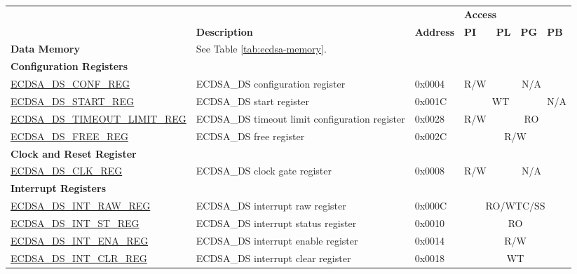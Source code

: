 \begin{small}
\begin{longtable}{ | p{4.8cm} | l | p{1.2cm} | l | l | l | l | }
\hline
\rowcolor{lightgray}
 &  &   & \multicolumn{4}{|l|}{\textbf{Access}} \\\cline{4-7}
\rowcolor{lightgray}
\multirow{-2}{*}{\textbf{Name}} & \multirow{-2}{*}{\textbf{Description}}  &  \multirow{-2}{*}{\textbf{Address}} & \textbf{PI} & \textbf{PL} & \textbf{PG} & \textbf{PB} \\ \hline
\endhead
\textbf{Data Memory} & \multicolumn{6}{|l|}{See Table \ref{tab:ecdsa-memory}.} \\ \hline
\multicolumn{7}{|l|}{\textbf{Configuration Registers}} \\\hline
\hyperref[regdesc:ECDSADSCONFREG]{ECDSA\_DS\_CONF\_REG} & ECDSA\_DS configuration register & 0x0004 & R/W & \multicolumn{3}{|c|}{N/A} \\ \hline
\hyperref[regdesc:ECDSADSSTARTREG]{ECDSA\_DS\_START\_REG} & ECDSA\_DS start register & 0x001C & \multicolumn{3}{|c|}{WT} & N/A \\ \hline
\hyperref[regdesc:ECDSADSTIMEOUTLIMITREG]{ECDSA\_DS\_TIMEOUT\_LIMIT\_REG} & ECDSA\_DS timeout limit configuration register & 0x0028 & R/W & \multicolumn{3}{|c|}{RO}  \\ \hline
\hyperref[regdesc:ECDSADSFREEREG]{ECDSA\_DS\_FREE\_REG} & ECDSA\_DS free register & 0x002C & \multicolumn{4}{|c|}{R/W} \\ \hline
\multicolumn{7}{|l|}{\textbf{Clock and Reset Register}} \\ \hline
\hyperref[regdesc:ECDSADSCLKREG]{ECDSA\_DS\_CLK\_REG} & ECDSA\_DS clock gate register & 0x0008 & R/W & \multicolumn{3}{|c|}{N/A} \\ \hline
\multicolumn{7}{|l|}{\textbf{Interrupt Registers}} \\ \hline
\hyperref[regdesc:ECDSADSINTRAWREG]{ECDSA\_DS\_INT\_RAW\_REG} & ECDSA\_DS interrupt raw register & 0x000C & \multicolumn{4}{|c|}{RO/WTC/SS} \\ \hline
\hyperref[regdesc:ECDSADSINTSTREG]{ECDSA\_DS\_INT\_ST\_REG} & ECDSA\_DS interrupt status register & 0x0010 & \multicolumn{4}{|c|}{RO} \\ \hline
\hyperref[regdesc:ECDSADSINTENAREG]{ECDSA\_DS\_INT\_ENA\_REG} & ECDSA\_DS interrupt enable register & 0x0014 & \multicolumn{4}{|c|}{R/W} \\ \hline
\hyperref[regdesc:ECDSADSINTCLRREG]{ECDSA\_DS\_INT\_CLR\_REG} & ECDSA\_DS interrupt clear register & 0x0018 & \multicolumn{4}{|c|}{WT} \\ \hline

\end{longtable}
\end{small}
